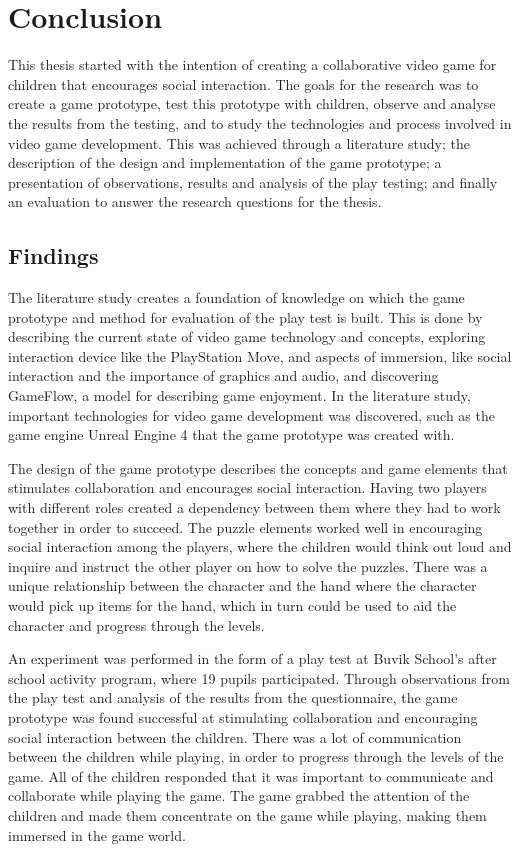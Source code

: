 \chapter{Conclusion}
This thesis started with the intention of creating a collaborative video game for children that encourages social interaction. The goals for the research was to create a game prototype, test this prototype with children, observe and analyse the results from the testing, and to study the technologies and process involved in video game development. This was achieved through a literature study; the description of the design and implementation of the game prototype; a presentation of observations, results and analysis of the play testing; and finally an evaluation to answer the research questions for the thesis.

\section{Findings}
The literature study creates a foundation of knowledge on which the game prototype and method for evaluation of the play test is built. This is done by describing the current state of video game technology and concepts, exploring interaction device like the PlayStation Move, and aspects of immersion, like social interaction and the importance of graphics and audio, and discovering GameFlow, a model for describing game enjoyment. In the literature study, important technologies for video game development was discovered, such as the game engine Unreal Engine 4 that the game prototype was created with.

The design of the game prototype describes the concepts and game elements that stimulates collaboration and encourages social interaction. Having two players with different roles created a dependency between them where they had to work together in order to succeed. The puzzle elements worked well in encouraging social interaction among the players, where the children would think out loud and inquire and instruct the other player on how to solve the puzzles. There was a unique relationship between the character and the hand where the character would pick up items for the hand, which in turn could be used to aid the character and progress through the levels. 

An experiment was performed in the form of a play test at Buvik School's after school activity program, where 19 pupils participated. Through observations from the play test and analysis of the results from the questionnaire, the game prototype was found successful at stimulating collaboration and encouraging social interaction between the children. There was a lot of communication between the children while playing, in order to progress through the levels of the game. All of the children responded that it was important to communicate and collaborate while playing the game. The game grabbed the attention of the children and made them concentrate on the game while playing, making them immersed in the game world. 

